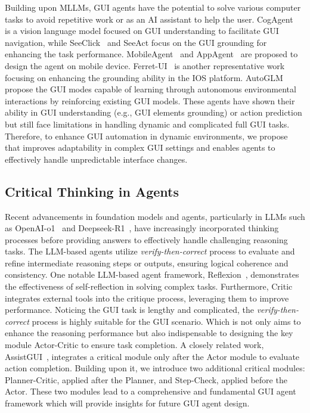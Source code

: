 Building upon MLLMs, GUI agents have the potential to solve various computer tasks to avoid repetitive work or as an AI assistant to help the user. CogAgent~\cite{hong2024cogagent} is a vision language model focused on GUI understanding to facilitate GUI navigation, while SeeClick~\cite{cheng2024seeclick} and SeeAct \cite{zheng2024seeact} focus on the GUI grounding for enhancing the task performance. MobileAgent~\cite{wang2024mobile} and AppAgent~\cite{zhang2023appagent} are proposed to design the agent on mobile device. Ferret-UI~\cite{you2025ferret} is another representative work focusing on enhancing the grounding ability in the IOS platform. AutoGLM~\cite{liu2024autoglmautonomousfoundationagents} propose the GUI modes capable of learning through autonomous environmental interactions by reinforcing existing GUI models. These agents have shown their ability in GUI understanding (e.g., GUI elements grounding) or action prediction but still face limitations in handling dynamic and complicated full GUI tasks. 
Therefore, to enhance GUI automation in dynamic environments, we propose \agent{} that improves adaptability in complex GUI settings and enables agents to effectively handle unpredictable interface changes.


\subsection{Critical Thinking in Agents}

Recent advancements in foundation models and agents, particularly in LLMs such as OpenAI-o1~\cite{openaio1} and Deepseek-R1~\cite{deepseekr1}, have increasingly incorporated thinking processes before providing answers to effectively handle challenging reasoning tasks. The LLM-based agents utilize \textit{verify-then-correct} process to evaluate and refine intermediate reasoning steps or outputs, ensuring logical coherence and consistency. One notable LLM-based agent framework, Reflexion~\cite{shinn2024reflexion}, demonstrates the effectiveness of self-reflection in solving complex tasks. Furthermore, Critic~\cite{gou2023critic} integrates external tools into the critique process, leveraging them to improve performance. Noticing the GUI task is lengthy and complicated, the \textit{verify-then-correct} process is highly suitable for the GUI scenario. Which is not only aims to enhance the reasoning performance but also indispensable to designing the key module Actor-Critic \cite{konda1999actorcritic} to ensure task completion.  A closely related work, AssistGUI~\cite{assistgui}, integrates a critical module only after the Actor module to evaluate action completion. Building upon it, we introduce two additional critical modules: Planner-Critic, applied after the Planner, and Step-Check, applied before the Actor. These two modules lead to a comprehensive and fundamental GUI agent framework \textbf{\agent{}} which will provide insights for future GUI agent design.